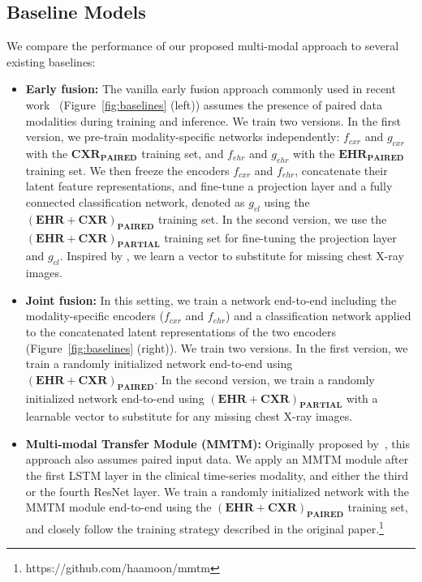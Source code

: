 \documentclass[pmlr]{jmlr}
\begin{document}
\subsection{Baseline Models}
We compare the performance of our proposed multi-modal approach to several existing baselines:
\vspace{-2mm}
\begin{itemize}\setlength\itemsep{-0.3em}
\item \textbf{Early fusion:} The vanilla early fusion approach commonly used in recent work~\citep{Huang2020_survey} (Figure~\ref{fig:baselines} (left)) assumes the presence of paired data modalities during training and inference. We train two versions. In the first version, we pre-train modality-specific networks independently: $f_{cxr}$ and $g_{cxr}$ with the $\mathbf{CXR}_\mathbf{PAIRED}$ training set, and $f_{ehr}$ and $g_{ehr}$ with the $\mathbf{EHR}_\mathbf{PAIRED}$ training set. We then freeze the encoders $f_{cxr}$ and $f_{ehr}$, concatenate their latent feature representations, and fine-tune a projection layer and a fully connected classification network, denoted as $g_{cl}$ using the $(\mathbf{EHR}+\mathbf{CXR})_\mathbf{PAIRED}$ training set. In the second version, we use the $(\mathbf{EHR}+\mathbf{CXR})_\mathbf{PARTIAL}$ training set for fine-tuning the projection layer and $g_{cl}$. Inspired by \cite{kyono2021miracle}, we learn a vector to substitute for missing chest X-ray images.  

\item \textbf{Joint fusion:} In this setting, we train a network end-to-end including the modality-specific encoders ($f_{cxr}$ and $f_{ehr}$) and a classification network applied to the concatenated latent representations of the two encoders (Figure~\ref{fig:baselines} (right)). We train two versions. In the first version, we train a randomly initialized network end-to-end using $(\mathbf{EHR}+\mathbf{CXR})_\mathbf{PAIRED}$. In the second version, we train a randomly initialized network end-to-end using $(\mathbf{EHR}+\mathbf{CXR})_\mathbf{PARTIAL}$ with a learnable vector to substitute for any missing chest X-ray images. 

\item \textbf{Multi-modal Transfer Module (MMTM):} Originally proposed by~\cite{vaezi20mmtm}, this approach also assumes paired input data. We apply an MMTM module after the first LSTM layer in the clinical time-series modality, and either the third or the fourth ResNet layer. We train a randomly initialized network with the MMTM module end-to-end using the $(\mathbf{EHR}+\mathbf{CXR})_\mathbf{PAIRED}$ training set, and closely follow the training strategy described in the original paper.\footnote{https://github.com/haamoon/mmtm} 


\end{itemize}
\end{document}
